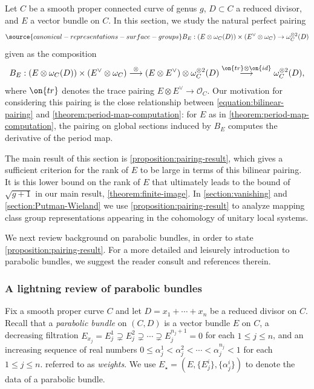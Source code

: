 Let $C$ be a smooth proper connected curve of genus $g$, $D\subset C$ a reduced divisor, and $E$
a vector bundle on $C$.
In this section, we study the natural perfect pairing
\begin{align}
	\label{equation:bilinear-pairing}
\source{canonical-representations-surface-groups}
	B_E:
(E \otimes \omega_C(D))\times (E^\vee\otimes \omega_C) \to
\omega_C^{\otimes 2}(D)
\end{align}
given as the composition $$B_E: (E \otimes \omega_C(D))\times (E^\vee\otimes \omega_C)\overset{\otimes}{\longrightarrow} (E\otimes E^\vee)\otimes \omega_C^{\otimes 2}(D)\overset{\on{tr}\otimes \on{id}}{\longrightarrow} \omega_C^{\otimes 2}(D),$$
where $\on{tr}$ denotes the trace pairing ${E}\otimes {E}^\vee\to
\mathscr{O}_C.$
Our motivation for considering this pairing is the close relationship between
\eqref{equation:bilinear-pairing} and
\autoref{theorem:period-map-computation}: for $E$ as in \autoref{theorem:period-map-computation}, the pairing on global sections induced by $B_E$ computes the derivative of the period map.

The main result of this section is \autoref{proposition:pairing-result},
which gives a sufficient criterion for the rank of $E$ to be large in terms of
this bilinear pairing. It is this lower bound on the
rank of $E$ that ultimately leads to the bound of $\sqrt{g+1}$ in our main result,
\autoref{theorem:finite-image}.
In \autoref{section:vanishing} and \autoref{section:Putman-Wieland} we use
\autoref{proposition:pairing-result} to analyze mapping class group representations appearing in the
cohomology of unitary local systems.

We next review background on parabolic bundles, in order to state
\autoref{proposition:pairing-result}.
For a more detailed and leisurely introduction to parabolic bundles, we suggest
the reader consult
\cite[\S2]{LL:geometric-local-systems}
and references therein.

\subsubsection{A lightning review of parabolic bundles}

Fix a smooth proper curve $C$ and let $D = x_1 + \cdots + x_n$ be a reduced divisor on
$C$.
Recall that a {\em parabolic bundle} on $(C,D)$ is a vector bundle $E$ on $C$, a
decreasing filtration $E_{x_j} = E_j^1 \supsetneq E_j^2 \supsetneq \cdots
\supsetneq E_j^{n_j+1} =
0$ for each $1 \leq j \leq n$, and an increasing sequence of real numbers $0\leq
\alpha_j^1<\alpha_j^2<\cdots<\alpha_j^{n_j}<1$ for each $1 \leq j \leq n$.
referred to as {\em weights}.
We use $E_\star = (E, \{E^i_j\}, \{\alpha^i_j\})$ to denote the data of a parabolic bundle.

